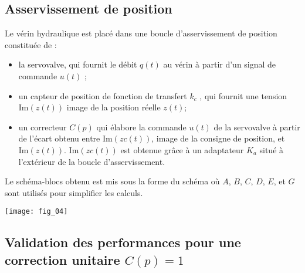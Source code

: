 \subsection*{Asservissement de position}

Le vérin hydraulique est placé dans une boucle d’asservissement de position constituée de :
\begin{itemize}
\item la servovalve, qui fournit le débit $q(t )$ au vérin à partir d’un signal de commande $u(t)$ ;
\item un capteur de position de fonction de transfert $k_c$ , qui fournit une tension $\text{Im}(z (t ))$ image
de la position réelle $z (t )$;
\item un correcteur $C(p)$ qui élabore la commande $u(t )$ de la servovalve à partir de l’écart obtenu
entre $\text{Im}(z c (t ))$, image de la consigne de position, et $\text{Im}(z (t ))$.
$\text{Im}(zc (t ))$ est obtenue grâce à un adaptateur $K_a$ situé à l’extérieur de la boucle d’asservissement.
\end{itemize}


\ifprof
\begin{corrige}
\end{corrige}
\else
\fi

\ifprof
\begin{corrige}
\end{corrige}
\else
\fi


Le schéma-blocs obtenu est mis sous la forme du schéma  où $A$, $B$, $C$, $D$, $E$, et $G$
sont utilisés pour simplifier les calculs.

\ifprof
\begin{corrige}
\end{corrige}
\else
\fi


\begin{center}
\texttt{[image: fig\_04]}
\end{center}

\subsection*{Validation des performances pour une correction unitaire $C(p) = 1$}

